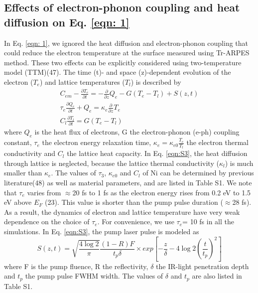 \subsection{Effects of electron-phonon coupling and heat diffusion on Eq. \ref{eqn: 1}}
In Eq. \ref{eqn: 1}, we ignored the heat diffusion and electron-phonon coupling that could reduce the electron temperature at the surface measured using Tr-ARPES method. These two effects can be explicitly considered using two-temperature model (TTM)(47). The time (t)- and space (z)-dependent evolution of the electron ($T_e$) and lattice temperatures ($T_l$) is described by
\begin{eqnarray*}
C_{em}-\frac{\partial T_e}{\partial t}=-\frac{\partial}{\partial z} Q_e - G(T_e-T_l)+S(z,t)\\
\tau_e\frac{\partial Q_e}{\partial t}+Q_e=\kappa_e \frac{\partial}{\partial z}T_e \\
C_l \frac{\partial T_l}{\partial t} = G(T_e - T_l)
\label{eqn:S3}
\end{eqnarray*}
where $Q_e$ is the heat flux of electrons, G the electron-phonon (e-ph) coupling constant, $\tau_e$ the electron energy relaxation time, $\kappa_e = \kappa_{e0}\frac{T_e}{T_l}$ the electron thermal conductivity and $C_l$ the lattice heat capacity. In Eq. \ref{eqn:S3}, the heat diffusion through lattice is neglected, because the lattice thermal conductivity ($\kappa_l$) is much smaller than $\kappa_e$. The values of $\tau_3$, $\kappa_{e0}$ and $C_l$ of Ni can be determined by previous literature(48) as well as material parameters, and are listed in Table S1. We note that $\tau_e$  varies from $\approx$20 fs to 1 fs as the electron energy rises from 0.2 eV to 1.5 eV above $E_F$ (23). This value is shorter than the pump pulse duration ($\approx$28 fs). As a result, the dynamics of electron and lattice temperature have very weak dependence on the choice of $\tau_e$. For convenience, we use $\tau_e$= 10 fs in all the simulations. In Eq. \ref{eqn:S3}, the pump laser pulse is modeled as
\begin{equation}
S(z,t)=\sqrt{\frac{4 \log{2}}{\pi}}\frac{(1-R)F}{t_p\delta}\times exp \left[-\frac{z}{\delta}-4\log{2} \left( \frac{t}{t_p} \right)^2 \right]
\label{eqn:S4}
\end{equation}
where F is the pump fluence, R the reflectivity, $\delta$ the IR-light penetration depth and $t_p$ the pump pulse FWHM width. The values of $\delta$ and $t_p$ are also listed in Table S1.
